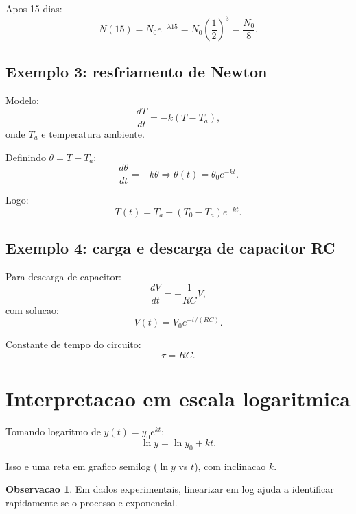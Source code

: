 \documentclass[12pt,a4paper,oneside]{book}
\theoremstyle{definition}
\newtheorem{remark}[definition]{Observacao}
\begin{document}
Apos 15 dias:
\begin{equation}
N(15)=N_0e^{-\lambda 15}=N_0\left(\frac{1}{2}\right)^3=\frac{N_0}{8}.
\end{equation}

\subsection{Exemplo 3: resfriamento de Newton}

Modelo:
\begin{equation}
\frac{dT}{dt}=-k(T-T_a),
\end{equation}
onde $T_a$ e temperatura ambiente.

Definindo $\theta=T-T_a$:
\begin{equation}
\frac{d\theta}{dt}=-k\theta \Rightarrow \theta(t)=\theta_0e^{-kt}.
\end{equation}

Logo:
\begin{equation}
T(t)=T_a + (T_0-T_a)e^{-kt}.
\end{equation}

\subsection{Exemplo 4: carga e descarga de capacitor RC}

Para descarga de capacitor:
\begin{equation}
\frac{dV}{dt}=-\frac{1}{RC}V,
\end{equation}
com solucao:
\begin{equation}
V(t)=V_0e^{-t/(RC)}.
\end{equation}

Constante de tempo do circuito:
\begin{equation}
\tau=RC.
\end{equation}

\section{Interpretacao em escala logaritmica}

Tomando logaritmo de $y(t)=y_0e^{kt}$:
\begin{equation}
\ln y = \ln y_0 + kt.
\end{equation}

Isso e uma reta em grafico semilog ($\ln y$ vs $t$), com inclinacao $k$.

\begin{remark}
Em dados experimentais, linearizar em log ajuda a identificar rapidamente se o processo e exponencial.
\end{remark}
\end{document}

